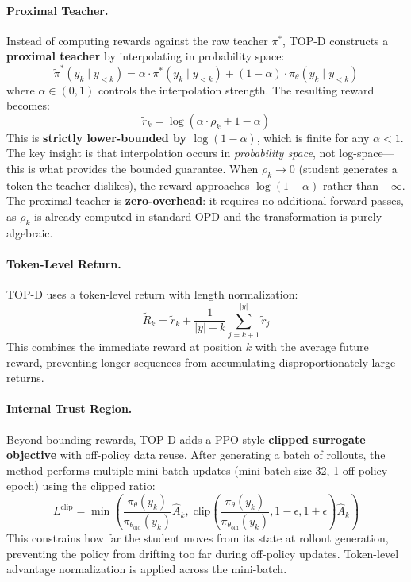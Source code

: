 \documentclass[11pt,a4paper]{article}
\begin{document}
\paragraph{Proximal Teacher.} Instead of computing rewards against the raw teacher $\pi^*$, TOP-D constructs a \textbf{proximal teacher} by interpolating in probability space:
\[
\tilde{\pi}^*(y_k \mid y_{<k}) = \alpha \cdot \pi^*(y_k \mid y_{<k}) + (1 - \alpha) \cdot \pi_\theta(y_k \mid y_{<k})
\]
where $\alpha \in (0, 1)$ controls the interpolation strength. The resulting reward becomes:
\[
\tilde{r}_k = \log\left(\alpha \cdot \rho_k + 1 - \alpha\right)
\]
This is \textbf{strictly lower-bounded by $\log(1 - \alpha)$}, which is finite for any $\alpha < 1$. The key insight is that interpolation occurs in \emph{probability space}, not log-space---this is what provides the bounded guarantee. When $\rho_k \to 0$ (student generates a token the teacher dislikes), the reward approaches $\log(1 - \alpha)$ rather than $-\infty$. The proximal teacher is \textbf{zero-overhead}: it requires no additional forward passes, as $\rho_k$ is already computed in standard OPD and the transformation is purely algebraic.

\paragraph{Token-Level Return.} TOP-D uses a token-level return with length normalization:
\[
\tilde{R}_k = \tilde{r}_k + \frac{1}{|y| - k} \sum_{j=k+1}^{|y|} \tilde{r}_j
\]
This combines the immediate reward at position $k$ with the average future reward, preventing longer sequences from accumulating disproportionately large returns.

\paragraph{Internal Trust Region.} Beyond bounding rewards, TOP-D adds a PPO-style \textbf{clipped surrogate objective} with off-policy data reuse. After generating a batch of rollouts, the method performs multiple mini-batch updates (mini-batch size 32, 1 off-policy epoch) using the clipped ratio:
\[
L^{\mathrm{clip}} = \min\left(\frac{\pi_\theta(y_k)}{\pi_{\theta_{\mathrm{old}}}(y_k)} \hat{A}_k, \; \mathrm{clip}\left(\frac{\pi_\theta(y_k)}{\pi_{\theta_{\mathrm{old}}}(y_k)}, 1-\epsilon, 1+\epsilon\right) \hat{A}_k\right)
\]
This constrains how far the student moves from its state at rollout generation, preventing the policy from drifting too far during off-policy updates. Token-level advantage normalization is applied across the mini-batch.
\end{document}
